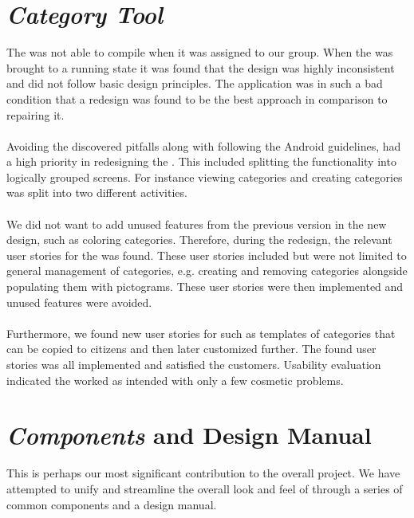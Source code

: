 \section*{\emph{Category Tool}}
The \ct was not able to compile when it was assigned to our group. When the \ct was brought to a running state it was found that the design was highly inconsistent and did not follow basic design principles. The application was in such a bad condition that a redesign was found to be the best approach in comparison to repairing it.
\\\\
Avoiding the discovered pitfalls along with following the Android guidelines, had a high priority in redesigning the \ct. This included splitting the functionality into logically grouped screens. For instance viewing categories and creating categories was split into two different activities.
\\\\
We did not want to add unused features from the previous version in the new design, such as coloring categories. Therefore, during the redesign, the relevant user stories for the \ct was found. These user stories included but were not limited to general management of categories, e.g. creating and removing categories alongside populating them with pictograms. These user stories were then implemented and unused features were avoided. 
\\\\
Furthermore, we found new user stories for \ct such as templates of categories that can be copied to citizens and then later customized further. The found user stories was all implemented and satisfied the customers. Usability evaluation indicated the \ct worked as intended with only a few cosmetic problems.

\section*{\giraf \emph{Components} and Design Manual}

This is perhaps our most significant contribution to the overall project. We have attempted to unify and streamline the overall look and feel of \giraf through a series of common components and a design manual.
